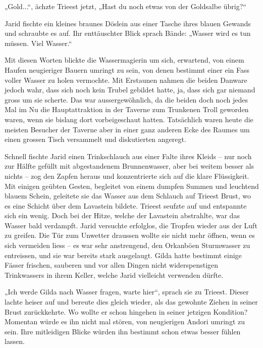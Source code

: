 \documentclass[10pt, a4paper, oneside]{book}
\begin{document}
„Gold...“, ächzte Trieest jetzt, „Hast du noch etwas von der Goldsalbe übrig?“

Jarid fischte ein kleines braunes Döslein aus einer Tasche ihres blauen Gewands und schraubte es auf. Ihr enttäuschter Blick sprach Bände: „Wasser wird es tun müssen. Viel Wasser.“

Mit diesen Worten blickte die Wassermagierin um sich, erwartend, von einem Haufen neugieriger Bauern umringt zu sein, von denen bestimmt einer ein Fass voller Wasser zu holen vermochte. Mit Erstaunen nahmen die beiden Danware jedoch wahr, dass sich noch kein Trubel gebildet hatte, ja, dass sich gar niemand gross um sie scherte. Das war aussergewöhnlich, da die beiden doch noch jedes Mal im Nu die Hauptattraktion in der Taverne zum Trunkenen Troll geworden waren, wenn sie bislang dort vorbeigeschaut hatten. Tatsächlich waren heute die meisten Besucher der Taverne aber in einer ganz anderen Ecke des Raumes um einen grossen Tisch versammelt und diskutierten angeregt.

Schnell fischte Jarid einen Trinkschlauch aus einer Falte ihres Kleids – nur noch zur Hälfte gefüllt mit abgestandenem Brunnenwasser, aber bei weitem besser als nichts – zog den Zapfen heraus und konzentrierte sich auf die klare Flüssigkeit. Mit einigen geübten Gesten, begleitet von einem dumpfen Summen und leuchtend blauem Schein, geleitete sie das Wasser aus dem Schlauch auf Trieest Brust, wo es eine Schicht über dem Lavastein bildete. Trieest seufzte auf und entspannte sich ein wenig. Doch bei der Hitze, welche der Lavastein abstrahlte, war das Wasser bald verdampft. Jarid versuchte erfolglos, die Tropfen wieder aus der Luft zu greifen. Die Tür zum Unwetter draussen wollte sie nicht mehr öffnen, wenn es sich vermeiden liess – es war sehr anstrengend, den Orkanböen Sturmwasser zu entreissen, und sie war bereits stark ausgelaugt. Gilda hatte bestimmt einige Fässer frischen, sauberen und vor allen Dingen nicht widerspenstigen Trinkwassers in ihrem Keller, welche Jarid vielleicht verwenden dürfte.

„Ich werde Gilda nach Wasser fragen, warte hier“, sprach sie zu Trieest. Dieser lachte heiser auf und bereute dies gleich wieder, als das gewohnte Ziehen in seiner Brust zurückkehrte. Wo wollte er schon hingehen in seiner jetzigen Kondition? Momentan würde es ihn nicht mal stören, von neugierigen Andori umringt zu sein. Ihre mitleidigen Blicke würden ihn bestimmt schon etwas besser fühlen lassen.\bigskip
\end{document}
